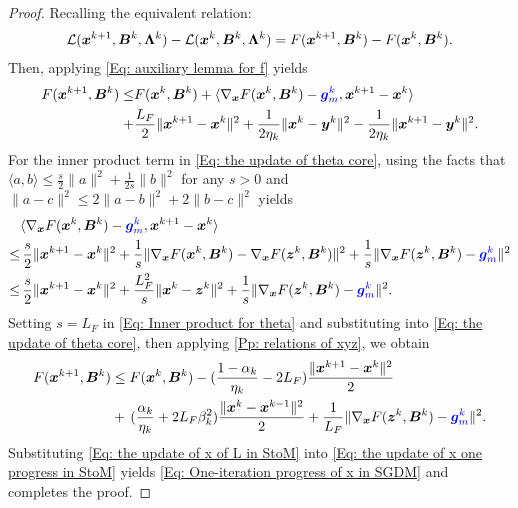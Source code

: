 \begin{proof}
    Recalling the equivalent relation:
    \begin{align}
        \label{Eq: the update of x one progress in StoM}\mathcal{L}(\bx^{k+1}, \bm{B}^{k}, \bm{\Lambda}^{k}) - \mathcal{L}(\bx^{k}, \bm{B}^{k}, \bm{\Lambda}^{k}) = F(\bx^{k+1}, \bm{B}^{k}) - F(\bx^{k}, \bm{B}^{k}).
    \end{align}
    Then, applying \eqref{Eq: auxiliary lemma for f} 
    yields
    \begin{align}
        \label{Eq: the update of theta core}F(\bx^{k+1}, \bm{B}^{k}) \leq & F(\bx^{k}, \bm{B}^{k}) + \langle \nabla_{\bx}F(\bx^{k}, \bm{B}^{k}) - \blue{\bg_m^{k}}, \bx^{k+1}- \bx^{k}\rangle \notag                              \\
        +                                                                 & \frac{L_{F}}{2}\|\bx^{k+1}- \bx^{k}\|^{2}+ \frac{1}{2\eta_{k}}\|\bx^{k}- \bm{y}^{k}\|^{2}- \frac{1}{2\eta_{k}}\|\bx^{k+1}- \bm{y}^{k}\|^{2}.
    \end{align}
    For the inner product term in \eqref{Eq: the update of theta core}, using
    the facts that
    $\langle a, b \rangle \leq \frac{s}{2}\|a\|^{2}+ \frac{1}{2s}\|b\|^{2}$ for
    any $s > 0$ and $\| a - c \|^{2}\leq 2\|a - b \|^{2}+ 2\|b -c\|^{2}$ yields
    { \begin{align}\label{Eq: Inner product for theta}&\langle \nabla_{\bx}F(\bx^{k}, \bm{B}^{k}) - \blue{\bg_m^{k}}, \bx^{k+1}- \bx^{k}\rangle \notag \\ \leq&\,\frac{s}{2}\|\bx^{k+1}- \bx^{k}\|^{2}+ \frac{1}{s}\|\nabla_{\bx}F(\bx^{k}, \bm{B}^{k}) - \nabla_{\bx}F(\bm{z}^{k}, \bm{B}^{k}) \|^{2}+ \frac{1}{s}\|\nabla_{\bx}F(\bm{z}^{k}, \bm{B}^{k}) - \blue{\bg_m^{k}}\|^{2}\notag \\ \leq&\, \frac{s}{2}\|\bx^{k+1}- \bx^{k}\|^{2}+ \frac{L^{2}_{F}}{s}\|\bx^{k}- \bm{z}^{k}\|^{2}+ \frac{1}{s}\|\nabla_{\bx}F(\bm{z}^{k}, \bm{B}^{k}) - \blue{\bg_m^{k}}\|^{2}.\end{align}}
    Setting $s = L_{F}$ in \eqref{Eq: Inner product for theta} and substituting into
    \eqref{Eq: the update of theta core}, then applying \cref{Pp: relations of xyz},
    we obtain
    \begin{align}
        F(\bx^{k+1}, \bm{B}^{k}) & \leq F(\bx^{k}, \bm{B}^{k}) - (\frac{1 - \alpha_{k}}{\eta_{k}}- 2L_{F})\frac{\|\bx^{k+1}- \bx^{k}\|^{2}}{2}\notag                                                                                           \\
                                 & +\,(\frac{\alpha_{k}}{\eta_{k}}+ 2L_{F}\beta_{k}^{2})\frac{\|\bx^{k}- \bx^{k-1}\|^{2}}{2}+ \frac{1}{L_{F}}\|\nabla_{\bx}F(\bm{z}^{k}, \bm{B}^{k}) - \blue{\bg_m^{k}}\|^{2}. \label{Eq: the update of x of L in StoM}
    \end{align}
    Substituting \eqref{Eq: the update of x of L in StoM} into \eqref{Eq: the update of x one progress in StoM}
    yields \eqref{Eq: One-iteration progress of x in SGDM} and completes the proof.
    

\end{proof}
